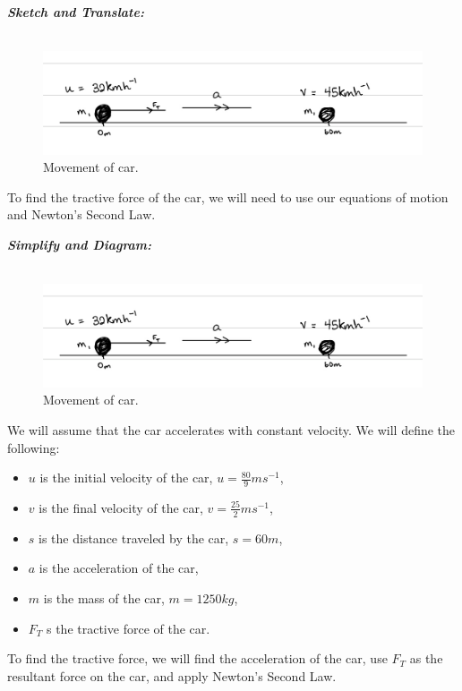\begin{subquestions}
\begin{subsubquestions}
\end{subsubquestions}	
	
	
\subquestion

\textbf{\textit{Sketch and Translate:}} \\ \\
\begin{figure}[H]
	\begin{center}
		\includegraphics[scale=0.25]{../2006/figures/2006q5-2}
		\caption{\label{2006:q5:Sketch2} Movement of car.}
	\end{center}
\end{figure}	
To find the tractive force of the car, we will need to use our equations of motion and Newton's Second Law.




\textbf{\textit{Simplify and Diagram:}} \\ \\
\begin{figure}[H]
	\begin{center}
		\includegraphics[scale=0.25]{../2006/figures/2006q5-2}
		\caption{\label{2006:q5:Diagram2} Movement of car.}
	\end{center}
\end{figure}
We will assume that the car accelerates with constant velocity. We will define the following:
\begin{itemize}
	\item $u$ is the initial velocity of the car, $u=\frac{80}{9}ms^{-1}$,
	\item $v$ is the final velocity of the car, $v=\frac{25}{2}ms^{-1}$,
	\item $s$ is the distance traveled by the car, $s=60m$,
	\item $a$ is the acceleration of the car,
	\item $m$ is the mass of the car, $m=1250kg$,
	\item $F_T$ s the tractive force of the car.
\end{itemize}
To find the tractive force, we will find the acceleration of the car, use $F_T$ as the resultant force on the car, and apply Newton's Second Law.
	


\end{subquestions}

